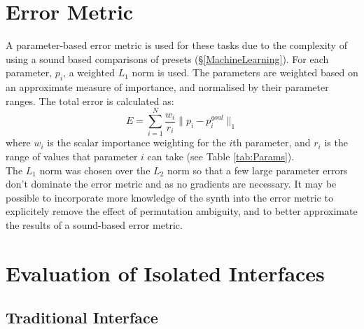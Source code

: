 \documentclass[11pt, oneside]{report}   	%
\begin{document}
\section{Error Metric}\label{sec:ErrorMetric}
\vspace{-5pt}
A parameter-based error metric is used for these tasks due to the complexity of using a sound based comparisons of presets (\S \ref{MachineLearning}).
For each parameter, $p_i$, a weighted $L_1$ norm is used. The parameters are weighted based on an approximate measure of importance, and normalised by their parameter ranges. The total error is calculated as:
\begin{equation}
E = \sum_{i=1}^{N}\frac{w_i}{r_i} \| p_i - p_i^{goal} \|_1 
\end{equation}
where $w_i$ is the scalar importance weighting for the $i$th parameter, and $r_i$ is the range of values that parameter $i$ can take (see Table \ref{tab:Params}).\\
The $L_1$ norm was chosen over the $L_2$ norm so that a few large parameter errors don't dominate the error metric and as no gradients are necessary.
It may be possible to incorporate more knowledge of the synth into the error metric to explicitely remove the effect of permutation ambiguity, and to better approximate the results of a sound-based error metric. 
\vspace{-10pt}
\section{Evaluation of Isolated Interfaces}
\subsection{Traditional Interface}\label{sec:TradEval}
\vspace{-5pt}
%	
%	
%	
\end{document}
